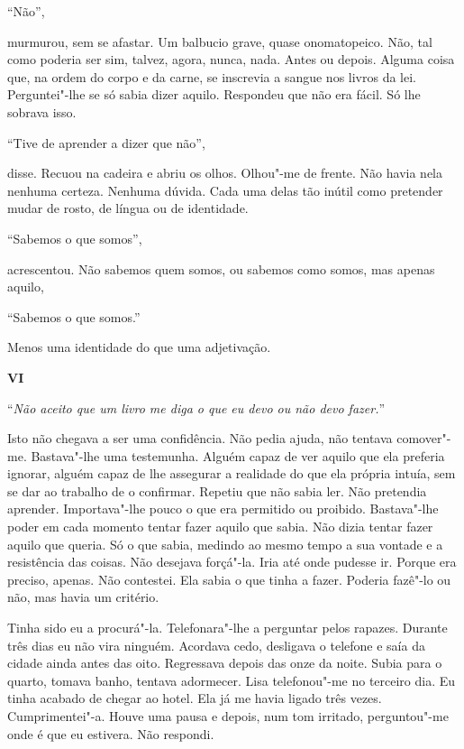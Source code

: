 ``Não'',

murmurou, sem se afastar. Um balbucio grave, quase onomatopeico. Não,
tal como poderia ser sim, talvez, agora, nunca, nada. Antes ou depois.
Alguma coisa que, na ordem do corpo e da carne, se inscrevia a sangue
nos livros da lei. Perguntei"-lhe se só sabia dizer aquilo. Respondeu
que não era fácil. Só lhe sobrava isso.

``Tive de aprender a dizer que não'',

disse. Recuou na cadeira e abriu os olhos. Olhou"-me de frente. Não
havia nela nenhuma certeza. Nenhuma dúvida. Cada uma delas tão inútil
como pretender mudar de rosto, de língua ou de identidade.

``Sabemos o que somos'',

acrescentou. Não sabemos quem somos, ou sabemos como somos, mas apenas
aquilo,

``Sabemos o que somos.''

Menos uma identidade do que uma adjetivação.

\vspace*{1.8cm}
\noindent{}\textbf{VI}

\bigskip

``\emph{Não aceito que um livro me diga o que eu devo ou não devo
fazer.}''

Isto não chegava a ser uma confidência. Não pedia ajuda, não tentava
comover"-me. Bastava"-lhe uma testemunha. Alguém capaz de ver aquilo que
ela preferia ignorar, alguém capaz de lhe assegurar a realidade do que
ela própria intuía, sem se dar ao trabalho de o confirmar. Repetiu que
não sabia ler. Não pretendia aprender. Importava"-lhe pouco o que era
permitido ou proibido. Bastava"-lhe poder em cada momento tentar fazer
aquilo que sabia. Não dizia tentar fazer aquilo que queria. Só o que
sabia, medindo ao mesmo tempo a sua vontade e a resistência das coisas.
Não desejava forçá"-la. Iria até onde pudesse ir. Porque era preciso,
apenas. Não contestei. Ela sabia o que tinha a fazer. Poderia fazê"-lo
ou não, mas havia um critério.

Tinha sido eu a procurá"-la. Telefonara"-lhe a perguntar pelos rapazes.
Durante três dias eu não vira ninguém. Acordava cedo, desligava o
telefone e saía da cidade ainda antes das oito. Regressava depois das
onze da noite. Subia para o quarto, tomava banho, tentava adormecer.
Lisa telefonou"-me no terceiro dia. Eu tinha acabado de chegar ao hotel.
Ela já me havia ligado três vezes. Cumprimentei"-a. Houve uma pausa e
depois, num tom irritado, perguntou"-me onde é que eu estivera. Não
respondi.

